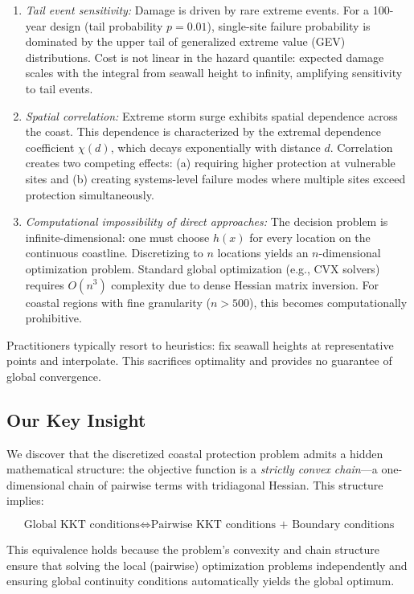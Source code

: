 \documentclass[12pt]{article}
\theoremstyle{definition}
\begin{document}
\begin{enumerate}
    \item \emph{Tail event sensitivity:} Damage is driven by rare extreme events. For a 100-year design (tail probability $p=0.01$), single-site failure probability is dominated by the upper tail of generalized extreme value (GEV) distributions. Cost is not linear in the hazard quantile: expected damage scales with the integral from seawall height to infinity, amplifying sensitivity to tail events.

    \item \emph{Spatial correlation:} Extreme storm surge exhibits spatial dependence across the coast. This dependence is characterized by the extremal dependence coefficient $\chi(d)$, which decays exponentially with distance $d$. Correlation creates two competing effects: (a) requiring higher protection at vulnerable sites and (b) creating systems-level failure modes where multiple sites exceed protection simultaneously.

    \item \emph{Computational impossibility of direct approaches:} The decision problem is infinite-dimensional: one must choose $h(x)$ for every location on the continuous coastline. Discretizing to $n$ locations yields an $n$-dimensional optimization problem. Standard global optimization (e.g., CVX solvers) requires $O(n^3)$ complexity due to dense Hessian matrix inversion. For coastal regions with fine granularity ($n>500$), this becomes computationally prohibitive.
\end{enumerate}

Practitioners typically resort to heuristics: fix seawall heights at representative points and interpolate. This sacrifices optimality and provides no guarantee of global convergence.

\subsection{Our Key Insight}

We discover that the discretized coastal protection problem admits a hidden mathematical structure: the objective function is a \emph{strictly convex chain}---a one-dimensional chain of pairwise terms with tridiagonal Hessian. This structure implies:

\[
\text{Global KKT conditions} \Longleftrightarrow \text{Pairwise KKT conditions + Boundary conditions}
\]

This equivalence holds because the problem's convexity and chain structure ensure that solving the local (pairwise) optimization problems independently and ensuring global continuity conditions automatically yields the global optimum.
\end{document}
